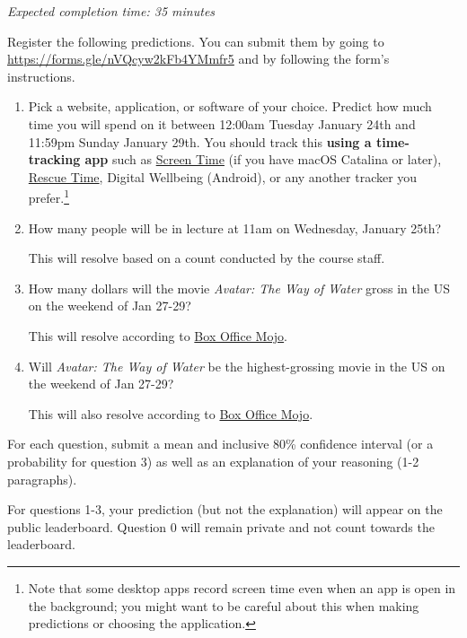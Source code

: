 \documentclass[11pt]{article}
\begin{document}
\emph{Expected completion time: 35 minutes}

Register the following predictions. You can submit them by going to 
\url{https://forms.gle/nVQcyw2kFb4YMmfr5} and by following the form's instructions.

\begin{enumerate}
\item[0.] Pick a website, application, or software of your choice. Predict how much time you will spend on it between 12:00am Tuesday January 24th and 11:59pm Sunday January 29th. You should track this {\bf using a time-tracking app} such as \href{https://support.apple.com/en-us/HT210387}{Screen Time} (if you have macOS Catalina or later), \href{https://www.rescuetime.com/}{Rescue Time}, Digital Wellbeing (Android), or any another tracker you prefer.\footnote{Note that some desktop apps record screen time even when an app is open in the background; you might want to be careful about this when making predictions or choosing the application.}

\item[1.] How many people will be in lecture at 11am on Wednesday, January 25th?

      This will resolve based on a count conducted by the course staff.

\item[2.] How many dollars will the movie \emph{Avatar: The Way of Water} gross in the US on the weekend of Jan 27-29? 

      This will resolve according to \href{https://www.boxofficemojo.com/release/rl3372254721/weekend/?ref_=bo_rl_tab#tabs}{Box Office Mojo}.

  \item[3.] Will \emph{Avatar: The Way of Water} be the highest-grossing movie in the US on the weekend of Jan 27-29?

      This will also resolve according to \href{https://www.boxofficemojo.com/weekend/?ref_=bo_nb_wey_secondarytab}{Box Office Mojo}.

\end{enumerate}
 
For each question, submit a mean and inclusive 80\% confidence interval (or a probability for question 3) 
as well as an explanation of your reasoning (1-2 paragraphs).

For questions 1-3, your prediction (but not the explanation) will appear on the public leaderboard. 
Question 0 will remain private and not count towards the leaderboard.
\end{document}
